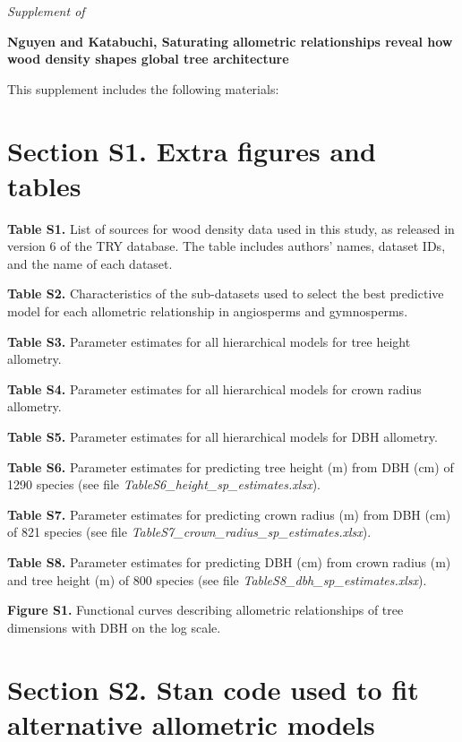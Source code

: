 \documentclass[
  12pt,
  letterpaper,
  DIV=11,
  numbers=noendperiod]{scrartcl}
\author{}
\date{}
\begin{document}
\emph{Supplement of}

\textbf{Nguyen and Katabuchi, Saturating allometric relationships reveal
how wood density shapes global tree architecture}

This supplement includes the following materials:

\section{Section S1. Extra figures and
tables}\label{section-s1.-extra-figures-and-tables}

\textbf{Table S1.} List of sources for wood density data used in this
study, as released in version 6 of the TRY database. The table includes
authors' names, dataset IDs, and the name of each dataset.

\textbf{Table S2.} Characteristics of the sub-datasets used to select
the best predictive model for each allometric relationship in
angiosperms and gymnosperms.

\textbf{Table S3.} Parameter estimates for all hierarchical models for
tree height allometry.

\textbf{Table S4.} Parameter estimates for all hierarchical models for
crown radius allometry.

\textbf{Table S5.} Parameter estimates for all hierarchical models for
DBH allometry.

\textbf{Table S6.} Parameter estimates for predicting tree height (m)
from DBH (cm) of 1290 species (see file
\emph{TableS6\_height\_sp\_estimates.xlsx}).

\textbf{Table S7.} Parameter estimates for predicting crown radius (m)
from DBH (cm) of 821 species (see file
\emph{TableS7\_crown\_radius\_sp\_estimates.xlsx}).

\textbf{Table S8.} Parameter estimates for predicting DBH (cm) from
crown radius (m) and tree height (m) of 800 species (see file
\emph{TableS8\_dbh\_sp\_estimates.xlsx}).

\textbf{Figure S1.} Functional curves describing allometric
relationships of tree dimensions with DBH on the log scale.

\section{Section S2. Stan code used to fit alternative allometric
models}\label{section-s2.-stan-code-used-to-fit-alternative-allometric-models}

\newpage
\end{document}
